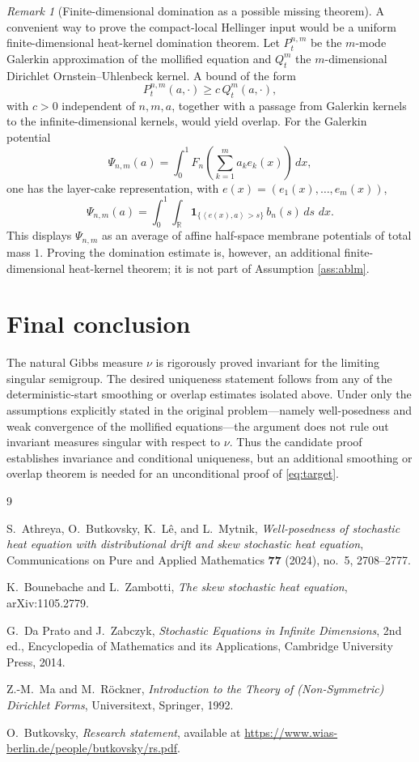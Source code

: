 \documentclass[12pt]{article}
\newcommand{\R}{\mathbb R}
\newcommand{\1}{\mathbf 1}
\newcommand{\dd}{\,d}
\newcommand{\ip}[2]{\left\langle #1,#2\right\rangle}
\theoremstyle{plain}
\theoremstyle{definition}
\theoremstyle{remark}
\newtheorem{remark}[theorem]{Remark}
\numberwithin{equation}{section}
\begin{document}
\begin{remark}[Finite-dimensional domination as a possible missing theorem]
A convenient way to prove the compact-local Hellinger input would be a uniform
finite-dimensional heat-kernel domination theorem.  Let \(P_t^{n,m}\) be the
\(m\)-mode Galerkin approximation of the mollified equation and \(Q_t^m\) the
\(m\)-dimensional Dirichlet Ornstein--Uhlenbeck kernel.  A bound of the form
\[
P_t^{n,m}(a,\cdot)\ge c\,Q_t^m(a,\cdot),
\]
with \(c>0\) independent of \(n,m,a\), together with a passage from Galerkin
kernels to the infinite-dimensional kernels, would yield overlap.  For the
Galerkin potential
\[
\Psi_{n,m}(a)
=
\int_0^1F_n\!\left(\sum_{k=1}^ma_ke_k(x)\right)\dd x,
\]
one has the layer-cake representation, with
\(e(x)=(e_1(x),\ldots,e_m(x))\),
\[
\Psi_{n,m}(a)
=
\int_0^1\int_{\R}
\1_{\{\ip{e(x)}{a}>s\}}\,b_n(s)\dd s\,\dd x.
\]
This displays \(\Psi_{n,m}\) as an average of affine half-space membrane
potentials of total mass \(1\).  Proving the domination estimate is, however,
an additional finite-dimensional heat-kernel theorem; it is not part of
Assumption \ref{ass:ablm}.
\end{remark}

\section*{Final conclusion}

The natural Gibbs measure \(\nu\) is rigorously proved invariant for the
limiting singular semigroup.  The desired uniqueness statement follows from
any of the deterministic-start smoothing or overlap estimates isolated above.
Under only the assumptions explicitly stated in the original problem---namely
well-posedness and weak convergence of the mollified equations---the argument
does not rule out invariant measures singular with respect to \(\nu\).  Thus the
candidate proof establishes invariance and conditional uniqueness, but an
additional smoothing or overlap theorem is needed for an unconditional proof of
\eqref{eq:target}.

\begin{thebibliography}{9}

S.~Athreya, O.~Butkovsky, K.~L\^{e}, and L.~Mytnik,
\emph{Well-posedness of stochastic heat equation with distributional drift and
skew stochastic heat equation},
Communications on Pure and Applied Mathematics \textbf{77} (2024), no.~5,
2708--2777.

K.~Bounebache and L.~Zambotti,
\emph{The skew stochastic heat equation},
arXiv:1105.2779.

G.~Da Prato and J.~Zabczyk,
\emph{Stochastic Equations in Infinite Dimensions},
2nd ed., Encyclopedia of Mathematics and its Applications, Cambridge
University Press, 2014.

Z.-M.~Ma and M.~R{\"o}ckner,
\emph{Introduction to the Theory of (Non-Symmetric) Dirichlet Forms},
Universitext, Springer, 1992.

O.~Butkovsky,
\emph{Research statement},
available at \url{https://www.wias-berlin.de/people/butkovsky/rs.pdf}.

\end{thebibliography}
\end{document}
